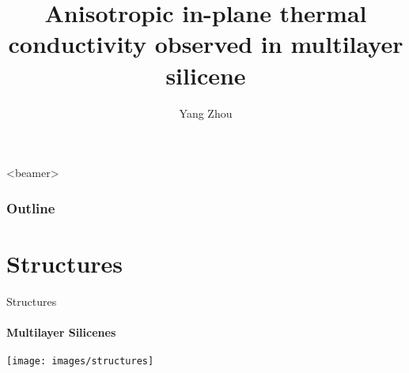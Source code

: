 \documentclass{beamer}
\title{Anisotropic in-plane thermal conductivity observed in multilayer silicene} %
\author{Yang Zhou}
\begin{document}
\frame{
\maketitle \\
{\color{white} \today}
}


\begin{frame}<beamer>
  \frametitle{Outline} %
  \tableofcontents
\end{frame}


\section{Structures}
\begin{frame}{Structures}
  \framesubtitle{Multilayer Silicenes}%
  \texttt{[image: images/structures]}
\end{frame}
\end{document}
